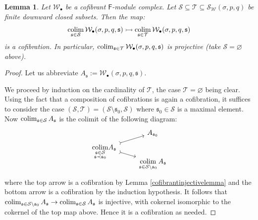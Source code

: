 \documentclass[12pt]{article}
\newtheorem{lemma}[theorem]{Lemma}
\theoremstyle{definition}
\theoremstyle{remark}
\numberwithin{equation}{subsection}
\newcommand{\T}{\mathcal T}
\newcommand{\W}{\mathcal W}
\newcommand{\s}{\mathfrak s}
\newcommand{\SSS}{\mathcal S}
\newcommand{\colim}{\operatornamewithlimits{colim}}
\newcommand{\sF}{\mathsf{F}}
\begin{document}
\begin{lemma}\label{cofibranthaslotsofcofibrations}
Let $\W_\bullet$ be a cofibrant $\sF$-module complex.  Let $\SSS\subseteq\T\subseteq\SSS_\W(\sigma,p,q)$ be finite downward closed subsets.  Then the map:
\begin{equation}
\colim_{\s\in\SSS}\W_\bullet(\sigma,p,q,\s)\rightarrowtail\colim_{\s\in\T}\W_\bullet(\sigma,p,q,\s)
\end{equation}
is a cofibration.  In particular, $\colim_{\s\in\T}\W_\bullet(\sigma,p,q,\s)$ is projective (take $\SSS=\varnothing$ above).
\end{lemma}

\begin{proof}
Let us abbreviate $A_\s:=\W_\bullet(\sigma,p,q,\s)$.

We proceed by induction on the cardinality of $\T$, the case $\T=\varnothing$ being clear.  Using the fact that a composition of cofibrations is again a cofibration, it suffices to consider the case $(\SSS,\T)=(\SSS\setminus\s_0,\SSS)$ where $\s_0\in\SSS$ is a maximal element.  Now $\colim_{\s\in\SSS}A_\s$ is the colimit of the following diagram:
\begin{equation}\label{colimitdiagrambuildup}
\begin{tikzcd}[row sep = tiny]
&A_{\s_0}\\
\smash{\displaystyle\colim_{\begin{smallmatrix}\s\in\SSS\cr\s\prec\s_0\end{smallmatrix}}}A_\s\ar[tail]{ur}\ar[tail]{rd}\\
&\displaystyle\colim_{\s\in\SSS\setminus\s_0}A_\s
\end{tikzcd}
\end{equation}
where the top arrow is a cofibration by Lemma \ref{cofibrantinjectivelemma} and the bottom arrow is a cofibration by the induction hypothesis.  It follows that $\colim_{\s\in\SSS\setminus\s_0}A_\s\to\colim_{\s\in\SSS}A_\s$ is injective, with cokernel isomorphic to the cokernel of the top map above.  Hence it is a cofibration as needed.
\end{proof}
\end{document}
